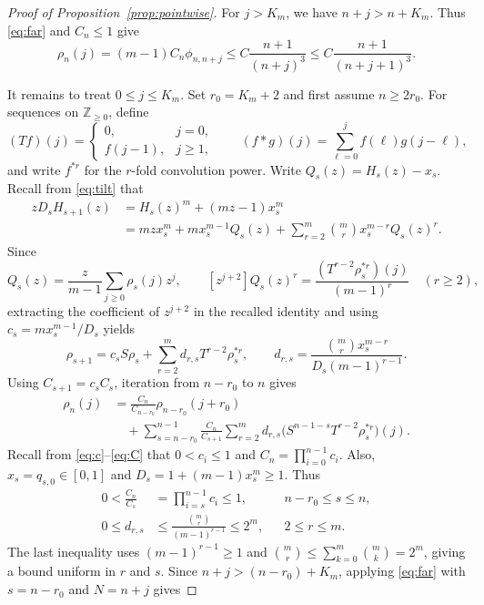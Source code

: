 \documentclass[11pt,letterpaper,reqno]{amsart}
\numberwithin{equation}{section}
\theoremstyle{plain}
\theoremstyle{remark}
\newcommand{\Zp}{\mathbb Z_{\ge0}}
\begin{document}
\begin{proof}[Proof of Proposition~\ref{prop:pointwise}]

For $j>K_m$, we have $n+j>n+K_m$. Thus \eqref{eq:far} and $C_n\le1$ give
\[
 \rho_n(j)=(m-1)C_n\phi_{n,n+j}
 \le C\frac{n+1}{(n+j)^3}
 \le C\frac{n+1}{(n+j+1)^3}.
\]

It remains to treat $0\le j\le K_m$. Set $r_0=K_m+2$ and first assume $n\ge2r_0$.
For sequences on $\Zp$, define
\[
 (Tf)(j)=
 \begin{cases}0,&j=0,\\ f(j-1),&j\ge1,\end{cases}
 \qquad
 (f*g)(j)=\sum_{\ell=0}^j f(\ell)g(j-\ell),
\]
and write $f^{*r}$ for the $r$-fold convolution power. Write $Q_s(z)=H_s(z)-x_s$. Recall from \eqref{eq:tilt} that
\[
\begin{aligned}
 zD_sH_{s+1}(z)
 &=H_s(z)^m+(mz-1)x_s^m\\
 &=mz x_s^m+mx_s^{m-1}Q_s(z)
   +\sum_{r=2}^m\binom mr x_s^{m-r}Q_s(z)^r.
\end{aligned}
\]
Since
\[
 Q_s(z)=\frac{z}{m-1}\sum_{j\ge0}\rho_s(j)z^j,\qquad
 [z^{j+2}]Q_s(z)^r
 =\frac{(T^{r-2}\rho_s^{*r})(j)}{(m-1)^r}\quad(r\ge2),
\]
extracting the coefficient of $z^{j+2}$ in the recalled identity and using $c_s=mx_s^{m-1}/D_s$ yields
\begin{equation}\label{eq:rhor}
 \rho_{s+1}=c_sS\rho_s+\sum_{r=2}^m d_{r,s}T^{r-2}\rho_s^{*r},\qquad
 d_{r,s}=\frac{\binom mr x_s^{m-r}}{D_s(m-1)^{r-1}}.
\end{equation}
Using $C_{s+1}=c_sC_s$, iteration from $n-r_0$ to $n$ gives
\[
\begin{aligned}
 \rho_n(j)
 &=\frac{C_n}{C_{n-r_0}}\rho_{n-r_0}(j+r_0)\\
 &\quad+\sum_{s=n-r_0}^{n-1}\frac{C_n}{C_{s+1}}
       \sum_{r=2}^m d_{r,s}
       \bigl(S^{n-1-s}T^{r-2}\rho_s^{*r}\bigr)(j).
\end{aligned}
\]
Recall from \eqref{eq:c}--\eqref{eq:C} that $0<c_i\le1$ and $C_n=\prod_{i=0}^{n-1}c_i$. Also, $x_s=q_{s,0}\in[0,1]$ and $D_s=1+(m-1)x_s^m\ge1$. Thus
\[
\begin{aligned}
 0<\frac{C_n}{C_s}
 &=\prod_{i=s}^{n-1}c_i\le1,
 &&n-r_0\le s\le n,\\
 0\le d_{r,s}
 &\le\frac{\binom mr}{(m-1)^{r-1}}\le2^m,
 &&2\le r\le m.
\end{aligned}
\]
The last inequality uses $(m-1)^{r-1}\ge1$ and $\binom mr\le\sum_{k=0}^m\binom mk=2^m$, giving a bound uniform in $r$ and $s$.
 Since $n+j>(n-r_0)+K_m$, applying \eqref{eq:far} with $s=n-r_0$ and $N=n+j$ gives

\end{proof}
\end{document}
